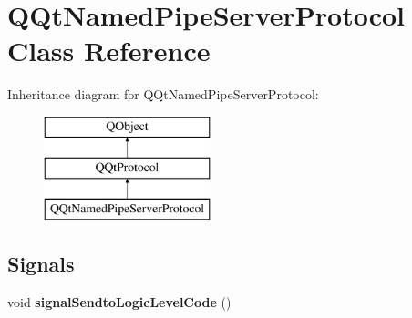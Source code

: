 \hypertarget{class_q_qt_named_pipe_server_protocol}{}\section{Q\+Qt\+Named\+Pipe\+Server\+Protocol Class Reference}
\label{class_q_qt_named_pipe_server_protocol}
Inheritance diagram for Q\+Qt\+Named\+Pipe\+Server\+Protocol\+:\begin{figure}[H]
\begin{center}
\leavevmode
\includegraphics[height=3.000000cm]{class_q_qt_named_pipe_server_protocol}
\end{center}
\end{figure}
\subsection*{Signals}
\begin{DoxyCompactItemize}
\item 
\mbox{\label{class_q_qt_named_pipe_server_protocol_ab2cce84d4bd6feb16da033e1452c0912}} 
void {\bfseries signal\+Sendto\+Logic\+Level\+Code} ()
\end{DoxyCompactItemize}
